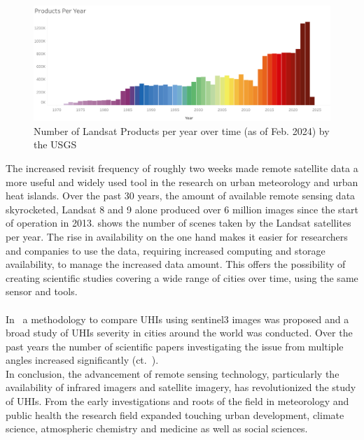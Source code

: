 \documentclass[12pt,a4paper, english,twoside]{scrartcl}
\begin{document}
  \begin{figure}[!htbp]
    \centering
    \includegraphics[width=\textwidth]{img/LandsatDataArchiveStatsProductsPerYear.png}
    \caption{Number of Landsat Products per year over time (as of Feb. 2024) by the \gls{USGS}~\autocite{landsatstats}\label{fig:landsatproductsovertime}}
  \end{figure}
  \noindent
  The increased revisit frequency of roughly two weeks made remote satellite data a more useful and widely used tool in the research on urban meteorology and urban heat islands.
  Over the past 30 years, the amount of available remote sensing data skyrocketed, Landsat 8 and 9 alone produced over 6 million images since the start of operation in 2013.  shows the number of scenes taken by the Landsat satellites per year.
  The rise in availability on the one hand makes it easier for researchers and companies to use the data, requiring increased computing and storage availability, to manage the increased data amount.
  This offers the possibility of creating scientific studies covering a wide range of cities over time, using the same sensor and tools. \\ \\
  In~\cite{Sobrino2020} a methodology to compare \glspl{UHI} using \gls{sentinel3} images was proposed and a broad study of \glspl{UHI} severity in cities around the world was conducted.
  Over the past years the number of scientific papers investigating the issue from multiple angles increased significantly (ct.~\cite[P. 3]{Piracha2022b}).\\
  In conclusion, the advancement of remote sensing technology, particularly the availability of infrared imagers and satellite imagery, has revolutionized the study of \glspl{UHI}. 
  From the early investigations and roots of the field in meteorology and public health the research field expanded touching urban development, climate science, atmospheric chemistry and medicine as well as social sciences.\\
\end{document}
